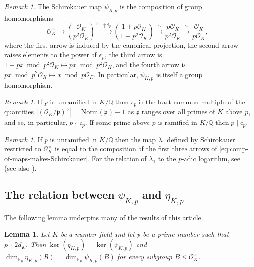 \documentclass[12pt, a4paper, usenames]{amsart}
\newcommand{\Q}{\mathbb{Q}}
\newcommand{\F}{\mathbb{F}}
\theoremstyle{plain}
\newtheorem{lemma}[theorem]{Lemma}
\theoremstyle{remark}
\newtheorem{remark}[theorem]{Remark}
\theoremstyle{definition}
\newcommand{\Norm}{\mathrm{Norm}}
\begin{document}
\begin{remark}\label{rmk:comp-of-maps-makes-Schirokauer}
The Schirokauer map $\psi_{K,p}$ is the composition of group
homomorphisms
\begin{equation}\label{eq:comp-of-maps-makes-Schirokauer}
\mathcal{O}_{K}^\times 
\longrightarrow 
\left( \frac{\mathcal{O}_{K}}{p^{2}\mathcal{O}_{K}} \right)^{\times}
\xrightarrow{\, \uparrow \epsilon_{p} \,}
\left( \frac{1+p\mathcal{O}_{K}}{1+p^{2}\mathcal{O}_{K}} \right)
\xrightarrow{\, \cong \, } 
\frac{p\mathcal{O}_{K}}{p^{2}\mathcal{O}_{K}}
\xrightarrow{\, \cong \, }
\frac{\mathcal{O}_{K}}{p\mathcal{O}_{K}},
\end{equation} 
where the first arrow is induced by the canonical projection,
the second arrow raises elements to the power of $\epsilon_{p}$,
the third arrow is
$1+px \bmod{p^{2}\mathcal{O}_{K}} \mapsto px \bmod{p^{2}\mathcal{O}_{K}}$, 
and the fourth arrow is
$px \bmod{p^{2}\mathcal{O}_{K}} \mapsto x \bmod{p\mathcal{O}_{K}}$.
In particular, $\psi_{K,p}$ is itself a group homomorphism.
\end{remark}

\begin{remark}\label{rmk:ep-ram-or-unram}
If $p$ is unramified in $K/\Q$ then $\epsilon_{p}$ is the least common multiple
of the quantities $|(\mathcal{O}_{K}/\mathfrak{p})^{\times}| = \Norm(\mathfrak{p})-1$ as $\mathfrak{p}$ ranges over all primes of $K$ above $p$, and so, in particular,
$p \nmid \epsilon_{p}$.
If some prime above $p$ is ramified in $K/\mathbb{Q}$ then $p \mid \epsilon_{p}$. 
\end{remark}

\begin{remark}
If $p$ is unramified in $K/\Q$ then the map $\lambda_{1}$ defined by Schirokauer 
\cite[p.~412]{MR1253502} restricted to $\mathcal{O}_{K}^{\times}$ is equal 
to the composition of the first three arrows of \eqref{eq:comp-of-maps-makes-Schirokauer}.  
For the relation of $\lambda_{1}$ to the $p$-adic logarithm, see \cite[p.~413]{MR1253502}
(see also \cite[\S 4.3]{MR4158582}).
\end{remark}

\subsection{The relation between $\psi_{K,p}$ and $\eta_{K,p}$}
The following lemma underpins many of the results of this article.

\begin{lemma}\label{lem:p-ranks-eta-psi-equal}
Let $K$ be a number field and let $p$ be a prime number such that $p \nmid 2d_{K}$.
Then $\ker(\eta_{K,p})=\ker(\psi_{K,p})$ and $\dim_{\F_{p}} \eta_{K,p}(B) = \dim_{\F_{p}} \psi_{K,p}(B)$ for every subgroup $B \leq \mathcal{O}_{K}^{\times}$.
\end{lemma}
\end{document}
